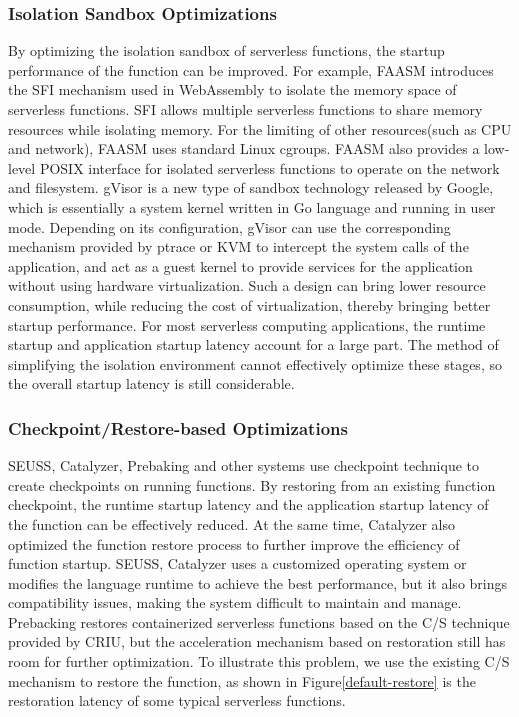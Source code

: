 \subsubsection{Isolation Sandbox Optimizations}
By optimizing the isolation sandbox of serverless functions,
the startup performance of the function can be improved.
For example,
FAASM\cite{faasm} introduces the SFI mechanism used in WebAssembly to isolate the memory space of serverless functions.
SFI allows multiple serverless functions to share memory resources while isolating memory.
For the limiting of other resources(such as CPU and network), FAASM uses standard Linux cgroups.
FAASM also provides a low-level POSIX interface for isolated serverless functions to operate on the network and filesystem.
gVisor\cite{gvisor} is a new type of sandbox technology released by Google,
which is essentially a system kernel written in Go language and running in user mode.
Depending on its configuration,
gVisor can use the corresponding mechanism provided by ptrace or KVM to intercept the system calls of the application,
and act as a guest kernel to provide services for the application without using hardware virtualization.
Such a design can bring lower resource consumption,
while reducing the cost of virtualization,
thereby bringing better startup performance.
For most serverless computing applications,
the runtime startup and application startup latency account for a large part. The method of simplifying the isolation environment cannot effectively optimize these stages,
so the overall startup latency is still considerable.

\subsubsection{Checkpoint/Restore-based Optimizations}
SEUSS\cite{seuss}, Catalyz\-er\cite{catalyzer}, Prebaking\cite{prebaking} and other systems use checkpoint technique to create checkpoints on running functions.
By restoring from an existing function checkpoint,
the runtime startup latency and the application startup latency of the function can be effectively reduced.
At the same time,
Catalyzer also optimized the function restore process to further improve the efficiency of function startup.
SEUSS, Catalyzer uses a customized operating system
or modifies the language runtime to achieve the best performance,
but it also brings compatibility issues,
making the system difficult to maintain and manage.
Prebacking restores containerized serverless functions based on the C/S technique provided by CRIU\cite{criu},
but the acceleration mechanism based on restoration still has room for further optimization.
To illustrate this problem,
we use the existing C/S mechanism to restore the function,
as shown in Figure\ref{default-restore} is the restoration latency of some typical serverless functions.

